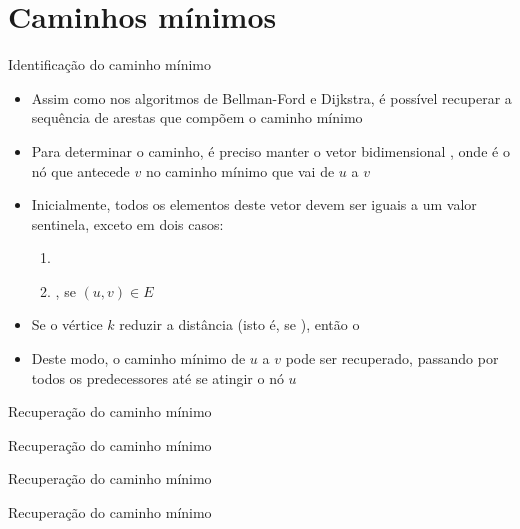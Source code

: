\section{Caminhos mínimos}

\begin{frame}[fragile]{Identificação do caminho mínimo}

    \begin{itemize}
        \item Assim como nos algoritmos de Bellman-Ford e Dijkstra, é possível recuperar a 
            sequência de arestas que compõem o caminho mínimo

        \item Para determinar o caminho, é preciso manter o vetor bidimensional , 
            onde  é o nó que antecede $v$ no caminho mínimo que vai de $u$ a 
            $v$

        \item Inicialmente, todos os elementos deste vetor devem ser iguais a um valor sentinela,
            exceto em dois casos:

            \begin{enumerate}
                \item {}
                \item {}, se $(u, v)\in E$
            \end{enumerate}

        \item Se o vértice $k$ reduzir a distância  (isto é, se
            ), então o 

        \item Deste modo, o caminho mínimo de $u$ a $v$ pode ser recuperado, passando por todos os 
            predecessores até se atingir o nó $u$
    \end{itemize}

\end{frame}

\begin{frame}[fragile]{Recuperação do caminho mínimo}
\end{frame}

\begin{frame}[fragile]{Recuperação do caminho mínimo}
\end{frame}

\begin{frame}[fragile]{Recuperação do caminho mínimo}
\end{frame}

\begin{frame}[fragile]{Recuperação do caminho mínimo}
\end{frame}
















